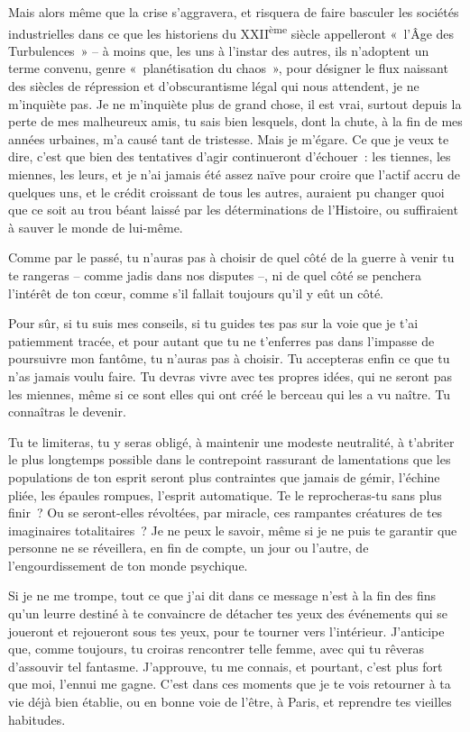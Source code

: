 \documentclass[
  extrafontsizes,
  oneside,
  14pt
]{memoir}
\begin{document}
Mais alors même que la crise s'aggravera, et risquera de faire basculer les
sociétés industrielles dans ce que les historiens du XXII\textsuperscript{ème}
siècle appelleront «~l'Âge des Turbulences~» -- à moins que, les uns à l'instar
des autres, ils n'adoptent un terme convenu, genre «~planétisation du chaos~»,
pour désigner le flux naissant des siècles de répression et d'obscurantisme
légal qui nous attendent, je ne m'inquiète pas. Je ne m'inquiète plus de grand
chose, il est vrai, surtout depuis la perte de mes malheureux amis, tu sais
bien lesquels, dont la chute, à la fin de mes années urbaines, m'a causé tant
de tristesse. Mais je m'égare. Ce que je veux te dire, c'est que bien des
tentatives d'agir continueront d'échouer~: les tiennes, les miennes, les leurs,
et je n'ai jamais été assez naïve pour croire que l'actif accru de quelques
uns, et le crédit croissant de tous les autres, auraient pu changer quoi que ce
soit au trou béant laissé par les déterminations de l'Histoire, ou suffiraient
à sauver le monde de lui-même.

Comme par le passé, tu n'auras pas à choisir de quel côté de la guerre à venir
tu te rangeras -- comme jadis dans nos disputes --, ni de quel côté se penchera
l'intérêt de ton cœur, comme s'il fallait toujours qu'il y eût un côté.

Pour sûr, si tu suis mes conseils, si tu guides tes pas sur la voie que je t'ai
patiemment tracée, et pour autant que tu ne t'enferres pas dans l'impasse de
poursuivre mon fantôme, tu n'auras pas à choisir. Tu accepteras enfin ce que tu
n'as jamais voulu faire. Tu devras vivre avec tes propres idées, qui ne seront
pas les miennes, même si ce sont elles qui ont créé le berceau qui les a vu
naître. Tu connaîtras le devenir.

Tu te limiteras, tu y seras obligé, à maintenir une modeste neutralité, à
t'abriter le plus longtemps possible dans le contrepoint rassurant de
lamentations que les populations de ton esprit seront plus contraintes que
jamais de gémir, l'échine pliée, les épaules rompues, l'esprit automatique. Te
le reprocheras-tu sans plus finir~? Ou se seront-elles révoltées, par miracle,
ces rampantes créatures de tes imaginaires totalitaires~? Je ne peux le savoir,
même si je ne puis te garantir que personne ne se réveillera, en fin de compte,
un jour ou l'autre, de l'engourdissement de ton monde psychique.

Si je ne me trompe, tout ce que j'ai dit dans ce message n'est à la fin des
fins qu'un leurre destiné à te convaincre de détacher tes yeux des événements
qui se joueront et rejoueront sous tes yeux, pour te tourner vers l'intérieur.
J'anticipe que, comme toujours, tu croiras rencontrer telle femme, avec qui tu
rêveras d'assouvir tel fantasme. J'approuve, tu me connais, et pourtant, c'est
plus fort que moi, l'ennui me gagne. C'est dans ces moments que je te vois
retourner à ta vie déjà bien établie, ou en bonne voie de l'être, à Paris, et
reprendre tes vieilles habitudes.
\end{document}
